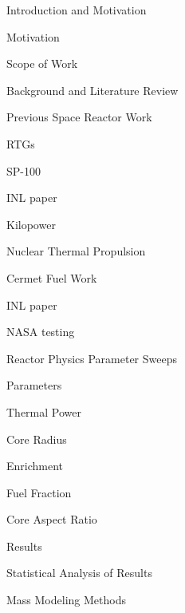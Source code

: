 \documentclass{report}
\begin{document}
\begin{outline}
  \item { Introduction and Motivation }
  \begin{outline}
    \item { Motivation } \\
    \item { Scope of Work } \\
  \end{outline}
  \item { Background and Literature Review }
      \begin{outline}
          \item { Previous Space Reactor Work }
                \begin{outline}
                \item {RTGs}
                \item {SP-100}
                \item {INL paper}
                \item {Kilopower}
                \item {Nuclear Thermal Propulsion}
                \end{outline}
           \item { Cermet Fuel Work }
                \begin{outline}
                \item {INL paper}
                \item {NASA testing}
                \end{outline}
      \end{outline}
  \item { Reactor Physics Parameter Sweeps }
      \begin{outline}
      \item {Parameters}
          \begin{outline}
          \item {Thermal Power}
          \item {Core Radius}
          \item {Enrichment}
          \item {Fuel Fraction}
          \item {Core Aspect Ratio}
          \end{outline}
      \item {Results}
      \item {Statistical Analysis of Results}
      \end{outline}
  \item { Mass Modeling Methods }

\end{outline}
\end{document}
